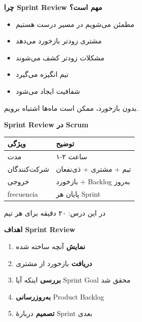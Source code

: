 \documentclass[14pt, a4paper, landscape]{extarticle}
\newcommand{\slide}[1]{%
    \newpage
    \begin{center}
    \begin{minipage}[t]{0.95\textwidth}
    \vspace{0.5cm}
    #1
    \vspace{0.5cm}
    \end{minipage}
    \end{center}
}
\newcommand{\slidetitle}[1]{%
    \begin{center}
        {\LARGE\bfseries\textcolor{primary}{#1}}
    \end{center}
    \vspace{0.5cm}
}
\newcommand{\myaccent}[1]{\textcolor{accent}{#1}}
\begin{document}
\slide{
    \slidetitle{چرا Sprint Review مهم است؟}
    \vspace{0.5cm}
    \begin{itemize}[itemsep=0.7em]
        \item {\large مطمئن می‌شویم در مسیر درست هستیم}
        \item {\large مشتری زودتر بازخورد می‌دهد}
        \item {\large مشکلات زودتر کشف می‌شوند}
        \item {\large تیم انگیزه می‌گیرد}
        \item {\large شفافیت ایجاد می‌شود}
    \end{itemize}
    \vspace{0.8cm}
    \begin{center}
        {\large\myaccent{بدون بازخورد، ممکن است ماه‌ها اشتباه برویم.}}
    \end{center}
}

\slide{
    \slidetitle{Sprint Review در Scrum}
    \vspace{0.5cm}
    \begin{center}
        \begin{tabular}{lp{9cm}}
            \toprule
            \textbf{ویژگی} & \textbf{توضیح} \\
            \midrule
            مدت & ۱-۲ ساعت \\
            \hline
            شرکت‌کنندگان & تیم + مشتری + ذی‌نفعان \\
            \hline
            خروجی & بازخورد + Backlog به‌روز \\
            \hline
            frecuencia & پایان هر Sprint \\
            \bottomrule
        \end{tabular}
    \end{center}
    \vspace{0.5cm}
    \begin{center}
        {\myaccent{در این درس: ۲۰ دقیقه برای هر تیم}}
    \end{center}
}

\slide{
    \slidetitle{اهداف Sprint Review}
    \vspace{0.5cm}
    \begin{enumerate}[itemsep=0.6em]
        \item {\large \textbf{نمایش} آنچه ساخته شده}
        \item {\large \textbf{دریافت} بازخورد از مشتری}
        \item {\large \textbf{بررسی} اینکه آیا Sprint Goal محقق شد}
        \item {\large \textbf{به‌روزرسانی} Product Backlog}
        \item {\large \textbf{تصمیم} دربارهٔ Sprint بعدی}
    \end{enumerate}
}
\end{document}
